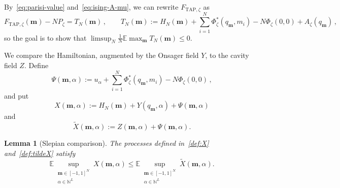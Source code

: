 \documentclass[a4paper,10pt,reqno]{amsart}
\numberwithin{equation}{section}
\newtheorem{lemma}[proposition]{Lemma}%
\newcommand{\dN}{\mathbb{N}}%
\newcommand{\dE}{\mathbb{E}}%
\newcommand{\TAP}{\mathrm{TAP}}
\newcommand{\bfm}{\mathbf{m}}
\begin{document}
	By~\eqref{eq:parisi-value} and~\eqref{eq:ising-A-mu}, we can rewrite $F_{\TAP,\zeta}$ as
	\begin{equation}\label{eq:ising-reduced}
		F_{\TAP,\zeta}(\bfm)-NP_\zeta=T_N(\bfm)\,,\qquad
		T_N(\bfm):=H_N(\bfm)+\sum_{i=1}^N\Phi_\zeta^*(q_\bfm,m_i)-N\Phi_\zeta(0,0)+A_\zeta(q_\bfm)\,,
	\end{equation}
	so the goal is to show that $\limsup_N\tfrac1N\dE\max_\bfm T_N(\bfm)\le0$. 
	
	We compare the Hamiltonian, augmented by the Onsager field $Y$, to the cavity field $Z$. Define
	\[
	\Psi(\bfm,\alpha):=u_\alpha+\sum_{i=1}^N\Phi_\zeta^*(q_\bfm,m_i)-N\Phi_\zeta(0,0)\,,
	\]
	and put 
	\begin{equation}\label{def:X}
		X(\bfm,\alpha):=H_N(\bfm)+Y(q_\bfm,\alpha)+\Psi(\bfm,\alpha)
	\end{equation}
	and 
	\begin{equation}\label{def:tildeX}\widetilde X(\bfm,\alpha):=Z(\bfm,\alpha)+\Psi(\bfm,\alpha).
	\end{equation}
	
	\begin{lemma}[Slepian comparison]\label{lem:ising-slepian}
		The processes defined in~\eqref{def:X} and~\eqref{def:tildeX} satisfy
		\[
		\dE
		\sup_{\substack{\bfm\in[-1,1]^N\\ \alpha\in\dN^L}}
		X(\bfm,\alpha)
		\le
		\dE
		\sup_{\substack{\bfm\in[-1,1]^N\\ \alpha\in\dN^L}}
		\widetilde X(\bfm,\alpha).
		\]
	\end{lemma}
	
\end{document}
